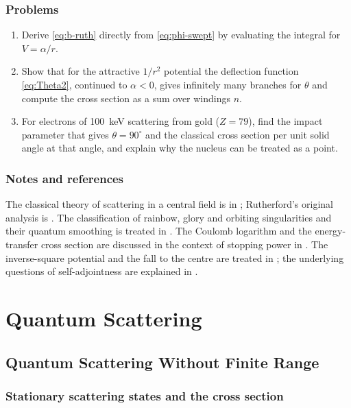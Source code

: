\documentclass[11pt,a4paper]{book}
\numberwithin{equation}{chapter}
\begin{document}
\section{Problems}
\begin{enumerate}
  \item Derive \eqref{eq:b-ruth} directly from \eqref{eq:phi-swept} by
        evaluating the integral for $V=\alpha/r$.
  \item Show that for the attractive $1/r^2$ potential the deflection function
        \eqref{eq:Theta2}, continued to $\alpha<0$, gives infinitely many
        branches for $\theta$ and compute the cross section as a sum over
        windings $n$.
  \item For electrons of 100~keV scattering from gold ($Z=79$), find the impact
        parameter that gives $\theta=90^\circ$ and the classical cross section
        per unit solid angle at that angle, and explain why the nucleus can be
        treated as a point.
\end{enumerate}

\section*{Notes and references}
The classical theory of scattering in a central field is in \cite{LL1,Goldstein}; Rutherford's original analysis is \cite{Rutherford11}. The classification of rainbow, glory and orbiting singularities and their quantum smoothing is treated in \cite{FordWheeler,BerryMount}. The Coulomb logarithm and the energy-transfer cross section are discussed in the context of stopping power in \cite{Jackson}. The inverse-square potential and the fall to the centre are treated in \cite{LL3,Case50}; the underlying questions of self-adjointness are explained in \cite{ReedSimonII}.

\part{Quantum Scattering}

\chapter{Quantum Scattering Without Finite Range}

\section{Stationary scattering states and the cross section}
\end{document}
